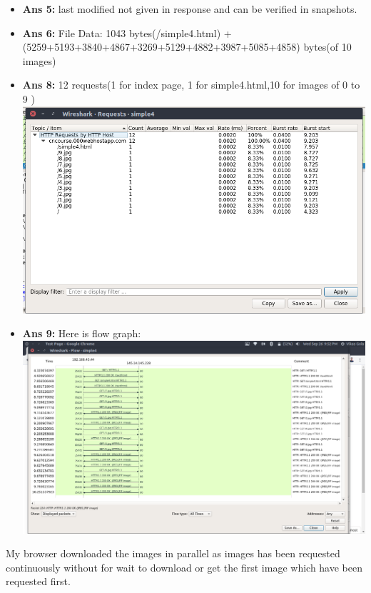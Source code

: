 \documentclass[14pt]{extarticle}
\begin{document}
    \begin{itemize}
        \item \textbf{Ans 5:} last modified not given in response and can be verified in snapshots.
        \item \textbf{Ans 6:} File Data: 1043 bytes(/simple4.html) + (5259+5193+3840+4867+3269+5129+4882+3987+5085+4858) bytes(of 10 images)
        \item \textbf{Ans 8:} 12 requests(1 for index page, 1 for simple4.html,10 for images of 0 to 9 )\\[10pt]
        \includegraphics[scale=0.40]{1_12_2}\\[10pt]
        \item \textbf{Ans 9:} Here is flow graph:\\[10pt]
        \includegraphics[scale=0.32]{1_12_4}\\[10pt]
    \end{itemize}
    My browser downloaded the images in parallel as images has been requested continuously without for wait to download 
    or get the first image which have been requested first.\\
    \vspace{1cm}
\end{document}
